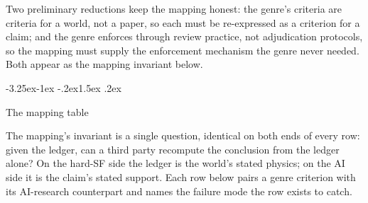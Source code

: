 \documentclass[11pt,a4paper]{article}
\makeatletter
\renewcommand\subsection{\@startsection{subsection}{2}{\z@}%
  {-3.25ex\@plus -1ex \@minus -.2ex}{1.5ex \@plus .2ex}%
  {\normalfont\large\bfseries\raggedright}}
\makeatother
\begin{document}
Two preliminary reductions keep the mapping honest: the genre's criteria are criteria for a world, not a paper, so each must be re-expressed as a criterion for a claim; and the genre enforces through review practice, not adjudication protocols, so the mapping must supply the enforcement mechanism the genre never needed. Both appear as the mapping invariant below.

\subsection{The mapping table}

The mapping's invariant is a single question, identical on both ends of every row: given the ledger, can a third party recompute the conclusion from the ledger alone? On the hard-SF side the ledger is the world's stated physics; on the AI side it is the claim's stated support. Each row below pairs a genre criterion with its AI-research counterpart and names the failure mode the row exists to catch.
\end{document}
